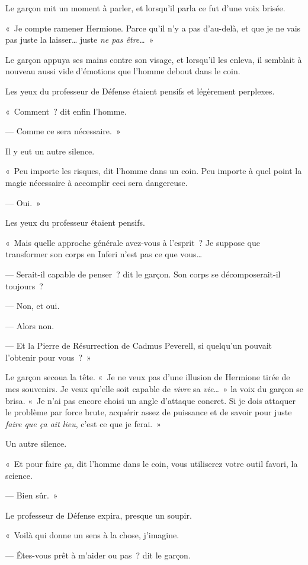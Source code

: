 Le garçon mit un moment à parler, et lorsqu'il parla ce fut d'une voix brisée.

«~Je compte ramener Hermione. Parce qu'il n'y a pas d'au-delà, et que je ne vais pas juste la laisser… juste \emph{ne pas être}…~»

Le garçon appuya ses mains contre son visage, et lorsqu'il les enleva, il semblait à nouveau aussi vide d'émotions que l'homme debout dans le coin.

Les yeux du professeur de Défense étaient pensifs et légèrement perplexes.

«~Comment~? dit enfin l'homme.

--- Comme ce sera nécessaire.~»

Il y eut un autre silence.

«~Peu importe les risques, dit l'homme dans un coin. Peu importe à quel point la magie nécessaire à accomplir ceci sera dangereuse.

--- Oui.~»

Les yeux du professeur étaient pensifs.

«~Mais quelle approche générale avez-vous à l'esprit~? Je suppose que transformer son corps en Inferi n'est pas ce que vous…

--- Serait-il capable de penser~? dit le garçon. Son corps se décomposerait-il toujours~?

--- Non, et oui.

--- Alors non.

--- Et la Pierre de Résurrection de Cadmus Peverell, si quelqu'un pouvait l'obtenir pour vous~?~»

Le garçon secoua la tête. «~Je ne veux pas d'une illusion de Hermione tirée de mes souvenirs. Je veux qu'elle soit capable de \emph{vivre} sa \emph{vie}…~» la voix du garçon se brisa. «~Je n'ai pas encore choisi un angle d'attaque concret. Si je dois attaquer le problème par force brute, acquérir assez de puissance et de savoir pour juste \emph{faire que ça ait lieu}, c'est ce que je ferai.~»

Un autre silence.

«~Et pour faire \emph{ça}, dit l'homme dans le coin, vous utiliserez votre outil favori, la science.

--- Bien sûr.~»

Le professeur de Défense expira, presque un soupir.

«~Voilà qui donne un sens à la chose, j'imagine.

--- Êtes-vous prêt à m'aider ou pas~? dit le garçon.

